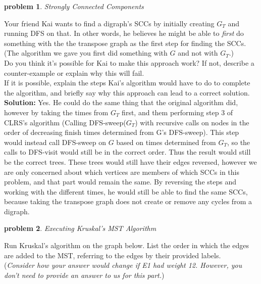\documentclass[10pt]{article}
\newcommand{\solution}[1]{\color{blue}\hfill\break\noindent\textbf{Solution:} #1\color{black}}
\newtheorem{problem}{\sc\color{cit}problem}
\begin{document}
\begin{problem} Strongly Connected Components \end{problem}

Your friend Kai wants to find a digraph's SCCs by initially creating $G_T$ and running DFS on that. In other words, he believes he might be able to \textit{first} do something with the the transpose graph as the first step for finding the SCCs. (The algorithm we gave you first did something with $G$ and not with $G_T$.) \\
Do you think it's possible for Kai to make this approach work? If not, describe a counter-example or explain why this will fail. \\
If it is possible, explain the steps Kai's algorithm would have to do to complete the algorithm, and briefly say why this approach can lead to a correct solution.
\solution{
    Yes. He could do the same thing that the original algorithm did, however by taking the times from $G_T$ first, and them performing step 3 of CLRS's algorithm (Calling DFS-sweep($G_T$) with recursive calls on nodes in the order of decreasing finish times determined from G's DFS-sweep). This step would instead call DFS-sweep on $G$ based on times determined from $G_T$, so the calls to DFS-visit would still be in the correct order. Thus the result would still be the correct trees. These trees would still have their edges reversed, however we are only concerned about which vertices are members of which SCCs in this problem, and that part would remain the same. By reversing the steps and working with the different times, he would still be able to find the same SCCs, because taking the transpose graph does not create or remove any cycles from a digraph. 
}

\newpage 
\begin{problem} Executing Kruskal's MST Algorithm \end{problem}
Run Kruskal's algorithm on the graph below. List the order in which the edges are added to the MST, referring to the edges by their provided labels. \\
(\emph{Consider how your answer would change if E1 had weight 12.  However, you don't need to provide an answer to us for this part.})
\end{document}
